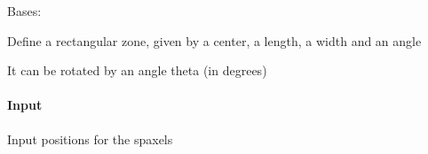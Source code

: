 \documentclass[letterpaper,10pt,english]{sphinxmanual}
\begin{document}

\begin{fulllineitems}
\label{\detokenize{api/pymusepipe:pymusepipe.util_image.RectangleZone}}
\pysigstartsignatures
{}
\pysigstopsignatures
\sphinxAtStartPar
Bases: {\hyperref[\detokenize{api/pymusepipe:pymusepipe.util_image.SelectionZone}]{}}

\sphinxAtStartPar
Define a rectangular zone, given by
a center, a length, a width and an angle

\begin{fulllineitems}
\label{\detokenize{api/pymusepipe:pymusepipe.util_image.RectangleZone.select}}
\pysigstartsignatures
{}
\pysigstopsignatures\begin{description}
\sphinxAtStartPar
It can be rotated by an angle theta (in degrees)

\end{description}


\paragraph{Input}
\label{\detokenize{api/pymusepipe:id137}}\begin{description}
\sphinxAtStartPar
Input positions for the spaxels

\end{description}

\end{fulllineitems}


\end{fulllineitems}

\end{document}
